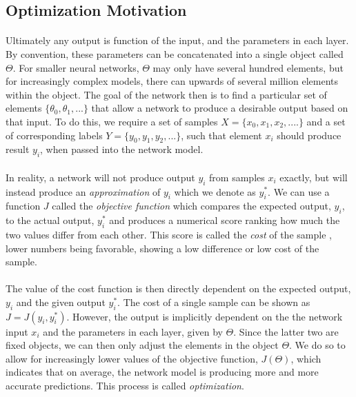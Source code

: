 \documentclass[12pt,letterpaper]{article}
\begin{document}

\subsection{Optimization Motivation}

\paragraph*{}Ultimately any output is function of the input, and the parameters in each layer. By convention, these parameters can be concatenated into a single object called $\Theta$. For smaller neural networks, $\Theta$ may only have several hundred elements, but for increasingly complex models, there can upwards of several million elements within the object. The goal of the network then is to find a particular set of elements $\{ \theta_0 , \theta_1 , ... \}$ that allow a network to produce a desirable output based on that input. To do this, we require a set of samples $X = \{x_0,x_1,x_2,....\}$ and a set of corresponding labels 
$Y = \{y_0,y_1,y_2,...\}$, such that element $x_i$ should produce result $y_i$, when passed into the network model. 

\paragraph*{}In reality, a network will not produce output $y_i$ from samples $x_i$ exactly, but will instead produce an \textit{approximation} of $y_i$ which we denote as $y_i^*$. We can use a function $J$ called the \textit{objective function} which compares the expected output, $y_i$, to the actual output, $y_i^*$ and produces a numerical score ranking how much the two values differ from each other. This score is called the \textit{cost} of the sample \cite{James}, lower numbers being favorable, showing a low difference or low cost of the sample.

\paragraph*{}The value of the cost function is then directly dependent on the expected output, $y_i$ and the given output $y_i^*$. The cost of a single sample can be shown as $J = J( y_i , y_i^* )$. However, the output is implicitly dependent on the the network input $x_i$ and the parameters in each layer, given by $\Theta$. Since the latter two are fixed objects, we can then only adjust the elements in the object $\Theta$. We do so to allow for increasingly lower values of the objective function, $J(\Theta)$, which indicates that on average, the network model is producing more and more accurate predictions. This process is called \textit{optimization}. 
\end{document}
